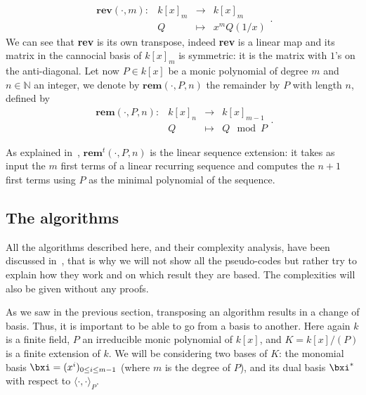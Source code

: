 \documentclass[a4paper,11pt]{article}
\theoremstyle{break}
\theoremstyle{definition}
\theoremstyle{remark}
\newcommand{\ps}[2]{\langle#1,#2\rangle}
\newcommand{\psdot}{\ps{\cdot}{\cdot}}
\begin{document}
\[  
\begin{array}{rccc}
  \textbf{rev}(\cdot,m): & k[x]_m & \to & k[x]_m \\
   & Q & \mapsto & x^mQ(1/x)
\end{array}.
\]
We can see that \textbf{rev} is its own transpose, indeed \textbf{rev} is a 
linear map and its matrix in the cannocial basis of $k[x]_m$ is symmetric: it 
is the matrix with $1$'s on the anti-diagonal. Let now $P\in k[x]$ be a monic 
polynomial of degree $m$ and $n\in\mathbb{N}$ an integer, we denote by 
$\textbf{rem}(\cdot,P,n)$ the remainder by $P$ with length $n$, defined by 
\[  
\begin{array}{rccc}
  \textbf{rem}(\cdot,P,n): & k[x]_n & \to & k[x]_{m-1} \\
   & Q & \mapsto & Q\mod P
\end{array}.
\]

As explained in~\cite{BoLeSc03}, $\textbf{rem}^t(\cdot,P,n)$ is the linear 
sequence extension: it takes as input the $m$ first terms of a linear 
recurring sequence and computes the $n+1$ first terms using $P$ as the minimal 
polynomial of the sequence.

\subsection{The algorithms}
\label{sec-algo}
All the algorithms described here, and their complexity analysis, have been
discussed in~\cite{DeDoSc14}, that is why we will not show all the pseudo-codes but
rather try to explain how they work and on which result they are based. The 
complexities will also be given without any proofs. 

As we saw in the previous section, transposing an algorithm results in a change
of basis. Thus, it is important to be able to go from a basis to another. Here
again $k$ is a finite field, $P$ an irreducible monic polynomial of $k[x]$, 
and
$K=k[x]/(P)$ is a finite extension of $k$. We will be considering two bases of
$K$: the monomial basis $\bxi=(x^i)_{0\leq i \leq m-1}$ (where $m$ is the
degree of $P$), and its dual basis $\bxi^*$ with respect to $\psdot_P$.
\end{document}
